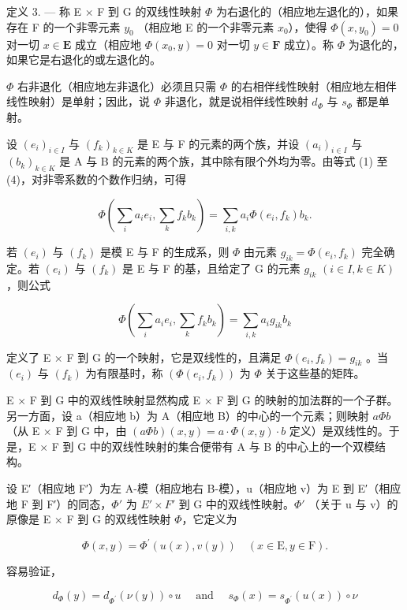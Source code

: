 定义 3. --- 称 E × F 到 G 的双线性映射 \(\Phi\) 为右退化的（相应地左退化的），如果存在 F 的一个非零元素 \(y_0\) （相应地 E 的一个非零元素 \(x_0\)），使得 \(\Phi(x, y_0) = 0\) 对一切 \(x \in \mathbf{E}\) 成立（相应地 \(\Phi(x_0, y) = 0\) 对一切 \(y \in \mathbf{F}\) 成立）。称 \(\Phi\) 为退化的，如果它是右退化的或左退化的。

\(\Phi\) 右非退化（相应地左非退化）必须且只需 \(\Phi\) 的右相伴线性映射（相应地左相伴线性映射）是单射；因此，说 \(\Phi\) 非退化，就是说相伴线性映射 \(d_{\Phi}\) 与 \(s_{\Phi}\) 都是单射。

设 \((e_i)_{i\in I}\) 与 \((f_k)_{k\in K}\) 是 E 与 F 的元素的两个族，并设 \((a_i)_{i\in I}\) 与 \((b_k)_{k\in K}\) 是 A 与 B 的元素的两个族，其中除有限个外均为零。由等式 (1) 至 (4)，对非零系数的个数作归纳，可得

\[
\Phi (\sum_ {i} a _ {i} e _ {i}, \sum_ {k} f _ {k} b _ {k}) = \sum_ {i, k} a _ {i} \Phi (e _ {i}, f _ {k}) b _ {k}.\tag{6}
\]

若 \((e_{i})\) 与 \((f_{k})\) 是模 E 与 F 的生成系，则 \(\Phi\) 由元素 \(g_{ik} = \Phi(e_{i}, f_{k})\) 完全确定。若 \((e_{i})\) 与 \((f_{k})\) 是 E 与 F 的基，且给定了 G 的元素 \(g_{ik}\) \((i \in I, k \in K)\)，则公式

\[
\Phi (\sum_ {i} a _ {i} e _ {i}, \sum_ {k} f _ {k} b _ {k}) = \sum_ {i, k} a _ {i} g _ {i k} b _ {k}\tag{6'}
\]

定义了 E × F 到 G 的一个映射，它是双线性的，且满足 \(\Phi(e_{i}, f_{k}) = g_{ik}\) 。当 \((e_{i})\) 与 \((f_{k})\) 为有限基时，称 \((\Phi(e_{i}, f_{k}))\) 为 \(\Phi\) 关于这些基的矩阵。

E × F 到 G 中的双线性映射显然构成 E × F 到 G 的映射的加法群的一个子群。另一方面，设 a（相应地 b）为 A（相应地 B）的中心的一个元素；则映射 \(a\Phi b\) （从 E × F 到 G 中，由 \((a\Phi b)(x, y) = a \cdot \Phi(x, y) \cdot b\) 定义）是双线性的。于是，E × F 到 G 中的双线性映射的集合便带有 A 与 B 的中心上的一个双模结构。

设 E′（相应地 F′）为左 A-模（相应地右 B-模），u（相应地 v）为 E 到 E′（相应地 F 到 F′）的同态，\(\Phi'\) 为 \(E' \times F'\) 到 G 中的双线性映射。\(\Phi'\) （关于 u 与 v）的原像是 E × F 到 G 的双线性映射 \(\Phi\)，它定义为

\[
\Phi (x, y) = \Phi^ {\prime} (u (x), v (y)) \quad (x \in \mathrm{E}, y \in \mathrm{F}).
\]

容易验证，

\[
d _ {\Phi} (y) = d _ {\Phi^ {\prime}} (\nu (y)) \circ u \quad \text { and } \quad s _ {\Phi} (x) = s _ {\Phi^ {\prime}} (u (x)) \circ \nu
\]

